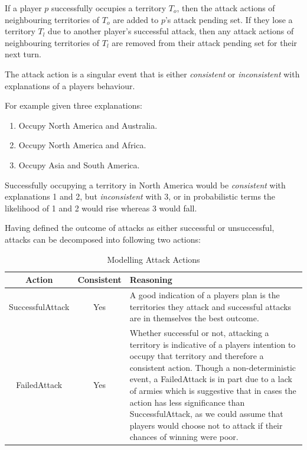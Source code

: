 \documentclass[parskip]{cs4rep}
\begin{document}
If a player $p$ successfully occupies a territory $T_{o}$, then the attack actions of neighbouring territories of $T_{o}$ are added to $p$'s attack pending set. If they lose a territory $T_{l}$ due to another player's successful attack, then any attack actions of neighbouring territories of $T_{l}$ are removed from their attack pending set for their next turn. 

The attack action is a singular event that is either \textit{consistent} or \textit{inconsistent} with explanations of a players behaviour. 

For example given three explanations:

\begin{enumerate}
\item
Occupy North America and Australia.
\item
Occupy North America and Africa.
\item
Occupy Asia and South America.
\end{enumerate}

Successfully occupying a territory in North America would be \textit{consistent} with explanations 1 and 2, but \textit{inconsistent} with 3, or in probabilistic terms the likelihood of 1 and 2 would rise whereas 3 would fall.

Having defined the outcome of attacks as either successful or unsuccessful, attacks can be decomposed into following two actions: 

\begin{table}[ht]
\centering
\begin{tabular}{|c|c|p{8cm}|}
\hline 
\textbf{Action} & \textbf{Consistent}  & \textbf{Reasoning} \\ 
\hline 
SuccessfulAttack & Yes & A good indication of a players plan is the territories they attack and successful attacks are in themselves the best outcome. \\ 
\hline 
FailedAttack & Yes & Whether successful or not, attacking a territory is indicative of a players intention to occupy that territory and therefore a consistent action. Though a non-deterministic event, a FailedAttack is in part due to a lack of armies which is suggestive that in cases the action has less significance than SuccessfulAttack, as we could assume that players would choose not to attack if their chances of winning were poor.\\ 
\hline
\end{tabular}
\caption{Modelling Attack Actions}
\label{table:attack-modelling}
\end{table}
\end{document}
